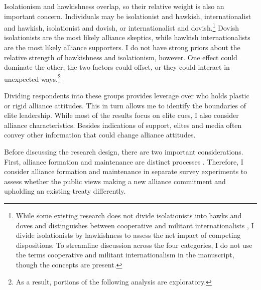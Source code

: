 \documentclass[12pt]{article}
\begin{document}
Isolationism and hawkishness overlap, so their relative weight is also an important concern.
Individuals may be isolationist and hawkish, internationalist and hawkish, isolationist and dovish, or internationalist and dovish.\footnote{While some existing research does not divide isolationists into hawks and doves and distinguishes between cooperative and militant internationalists \citep{Kertzeretal2014}, I divide isolationists by hawkishness to assess the net impact of competing dispositions. To streamline discussion across the four categories, I do not use the terms cooperative and militant internationalism in the manuscript, though the concepts are present.}  
Dovish isolationists are the most likely alliance skeptics, while hawkish internationalists are the most likely alliance supporters. 
I do not have strong priors about the relative strength of hawkishness and isolationism, however.
One effect could dominate the other, the two factors could offset, or they could interact in unexpected ways.\footnote{As a result, portions of the following analysis are exploratory.}


Dividing respondents into these groups provides leverage over who holds plastic or rigid alliance attitudes. 
This in turn allows me to identify the boundaries of elite leadership. 
While most of the results focus on elite cues, I also consider alliance characteristics. 
Besides indications of support, elites and media often convey other information that could change alliance attitudes.  


Before discussing the research design, there are two important considerations. 
First, alliance formation and maintenance are distinct processes \citep{Snyder1997}. 
Therefore, I consider alliance formation and maintenance in separate survey experiments to assess whether the public views making a new alliance commitment and upholding an existing treaty differently. 
\end{document}
